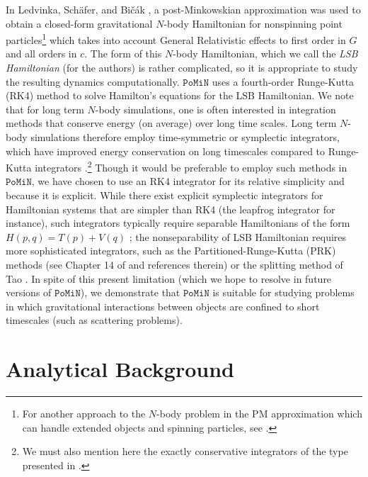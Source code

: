 \documentclass[aps,onecolumn,notitlepage,eqsecnum,nofootinbib,floatfix,superscriptaddress]{revtex4-1}
\newcommand{\codename}{\mathtt{PoMiN}}
\begin{document}
In Ledvinka, Sch{\"a}fer, and Bi{\v c}{\'a}k \cite{PM}, a post-Minkowskian approximation was used to obtain a closed-form gravitational $N$-body Hamiltonian for nonspinning point particles\footnote{For another approach to the $N$-body problem in the PM approximation which can handle extended objects and spinning particles, see \cite{ZschockeSoffel}.} which takes into account General Relativistic effects to first order in $G$ and all orders in $c$. The form of this $N$-body Hamiltonian, which we call the \textit{LSB Hamiltonian} (for the authors) is rather complicated, so it is appropriate to study the resulting dynamics computationally. $\codename$ uses a fourth-order Runge-Kutta (RK4) method to solve Hamilton's equations for the LSB Hamiltonian. We note that for long term $N$-body simulations, one is often interested in integration methods that conserve energy (on average) over long time scales. Long term $N$-body simulations therefore employ time-symmetric or symplectic integrators, which have improved energy conservation on long timescales compared to Runge-Kutta integrators \cite{Hutetal1997,Hutetal1995}.\footnote{We must also mention here the exactly conservative integrators of the type presented in \cite{Shadwicketal1995}.} Though it would be preferable to employ such methods in $\codename$, we have chosen to use an RK4 integrator for its relative simplicity and because it is explicit. While there exist explicit symplectic integrators for Hamiltonian systems that are simpler than RK4 (the leapfrog integrator for instance), such integrators typically require separable Hamiltonians of the form $H(p,q)=T(p)+V(q)$ \cite{ForestRuth1990,*Yoshida1990}; the nonseparability of LSB Hamiltonian requires more sophisticated integrators, such as the Partitioned-Runge-Kutta (PRK) methods (see Chapter 14 of \cite{SanzSernaCalvo1994} and references therein) or the splitting method of Tao \cite{Tao2016}. In spite of this present limitation (which we hope to resolve in future versions of $\codename$), we demonstrate that $\codename$ is suitable for studying problems in which gravitational interactions between objects are confined to short timescales (such as scattering problems). 

\section{Analytical Background}
%
%
\end{document}
